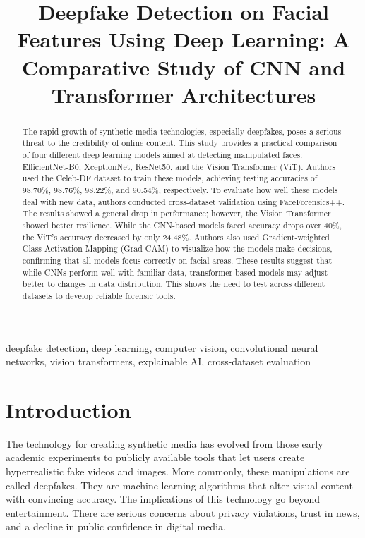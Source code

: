 \documentclass[conference]{IEEEtran}
\begin{document}
\title{Deepfake Detection on Facial Features Using Deep Learning: A Comparative Study of CNN and Transformer Architectures}

\author{
}

\maketitle

\begin{abstract}
The rapid growth of synthetic media technologies, especially deepfakes, poses a serious threat to the credibility of online content. This study provides a practical comparison of four different deep learning models aimed at detecting manipulated faces: EfficientNet-B0, XceptionNet, ResNet50, and the Vision Transformer (ViT). Authors used the Celeb-DF dataset to train these models, achieving testing accuracies of 98.70\%, 98.76\%, 98.22\%, and 90.54\%, respectively. To evaluate how well these models deal with new data, authors conducted cross-dataset validation using FaceForensics++. The results showed a general drop in performance; however, the Vision Transformer showed better resilience. While the CNN-based models faced accuracy drops over 40\%, the ViT's accuracy decreased by only 24.48\%. Authors also used Gradient-weighted Class Activation Mapping (Grad-CAM) to visualize how the models make decisions, confirming that all models focus correctly on facial areas. These results suggest that while CNNs perform well with familiar data, transformer-based models may adjust better to changes in data distribution. This shows the need to test across different datasets to develop reliable forensic tools.
\end{abstract}

\begin{IEEEkeywords}
deepfake detection, deep learning, computer vision, convolutional neural networks, vision transformers, explainable AI, cross-dataset evaluation
\end{IEEEkeywords}

\section{Introduction}
The technology for creating synthetic media has evolved from those early academic experiments to publicly available tools that let users create hyperrealistic fake videos and images. More commonly, these manipulations are called deepfakes. They are machine learning algorithms that alter visual content with convincing accuracy. The implications of this technology go beyond entertainment. There are serious concerns about privacy violations, trust in news, and a decline in public confidence in digital media.
\end{document}
